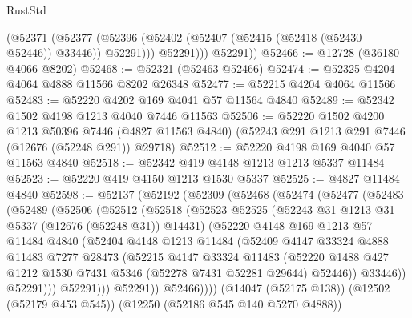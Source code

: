 \begin{lexlean}{RustStd}
\begin{coremodule}
            (@52371
              (@52377 (@52396 (@52402 (@52407 (@52415 (@52418 (@52430 @52446)) @33446)) @52291)))
              @52291)))
        @52291))
@52466 := @12728 (@36180 @4066 @8202)
@52468 := @52321 (@52463 @52466)
@52474 := @52325 @4204 @4064 @4888 @11566 @8202 @26348
@52477 := @52215 @4204 @4064 @11566
@52483 := @52220 @4202 @169 @4041 @57 @11564 @4840
@52489 := @52342 @1502 @4198 @1213 @4040 @7446 @11563
@52506 := @52220
    @1502
    @4200
    @1213
    @50396
    @7446
    (@4827 @11563 @4840)
    (@52243 @291 @1213 @291 @7446 (@12676 (@52248 @291)) @29718)
@52512 := @52220 @4198 @169 @4040 @57 @11563 @4840
@52518 := @52342 @419 @4148 @1213 @1213 @5337 @11484
@52523 := @52220 @419 @4150 @1213 @1530 @5337
@52525 := @4827 @11484 @4840
@52598 := @52137
    (@52192
      (@52309
        (@52468
          (@52474
            (@52477
              (@52483
                (@52489
                  (@52506
                    (@52512
                      (@52518
                        (@52523
                          @52525
                          (@52243 @31 @1213 @31 @5337 (@12676 (@52248 @31)) @14431)
                          (@52220
                            @4148
                            @169
                            @1213
                            @57
                            @11484
                            @4840
                            (@52404
                              @4148
                              @1213
                              @11484
                              (@52409
                                @4147
                                @33324
                                @4888
                                @11483
                                @7277
                                @28473
                                (@52215
                                  @4147
                                  @33324
                                  @11483
                                  (@52220
                                    @1488
                                    @427
                                    @1212
                                    @1530
                                    @7431
                                    @5346
                                    (@52278 @7431 @52281 @29644)
                                    @52446))
                                @33446))
                            @52291)))
                      @52291)))
                @52291))
            @52466))))
    (@14047 (@52175 @138))
    (@12502 (@52179 @453 @545))
    (@12250 (@52186 @545 @140 @5270 @4888))

\end{coremodule}
\end{lexlean}

